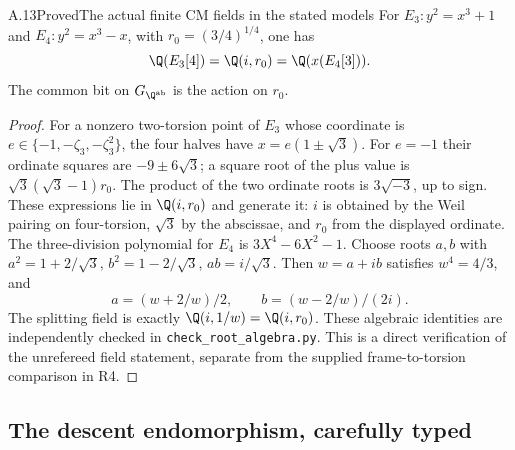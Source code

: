 \begin{statement}{A.13}{Proved}{The actual finite CM fields in the stated models}
For $E_3:y^2=x^3+1$ and $E_4:y^2=x^3-x$, with
$r_0=(3/4)^{1/4}$, one has
\[
 \Q(E_3[4])=\Q(i,r_0)=\Q(x(E_4[3])).
\]
The common bit on $G_{\Q^{\rm ab}}$ is the action on $r_0$.
\end{statement}
\begin{proof}
For a nonzero two-torsion point of $E_3$ whose coordinate is
$e\in\{-1,-\zeta_3,-\zeta_3^2\}$, the four halves have
$x=e(1\pm\sqrt3)$. For $e=-1$ their ordinate squares
are $-9\pm6\sqrt3$; a square root of the plus value is
$\sqrt3(\sqrt3-1)r_0$. The product of the two ordinate
roots is $3\sqrt{-3}$, up to sign. These expressions lie
in $\Q(i,r_0)$ and generate it: $i$ is obtained by the
Weil pairing on four-torsion, $\sqrt3$ by the abscissae,
and $r_0$ from the displayed ordinate.
The three-division polynomial for $E_4$ is
$3X^4-6X^2-1$. Choose roots $a,b$ with
$a^2=1+2/\sqrt3$, $b^2=1-2/\sqrt3$, $ab=i/\sqrt3$.
Then $w=a+ib$ satisfies $w^4=4/3$, and
\[
 a=(w+2/w)/2,\qquad b=(w-2/w)/(2i).
\]
The splitting field is exactly $\Q(i,1/w)=\Q(i,r_0)$.
These algebraic identities are independently checked in
\texttt{check\_root\_algebra.py}. This is a direct verification
of the unrefereed field statement, separate from the supplied
frame-to-torsion comparison in R4.
\end{proof}

\subsection{The descent endomorphism, carefully typed}

